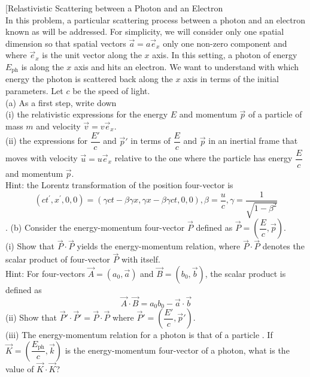 \newpage
\begin{solution}[{\large\color{plainred}Relastivistic Scattering between a Photon and an Electron}\\
	\small
	 In this problem, a particular scattering process between a photon and an electron known as  will be addressed. For simplicity, we will consider only one spatial dimension so that spatial vectors $\vec{a}=a\vec{e}_x$   only one non-zero component and where $\vec{e}_x$ is the unit vector along the $x$ axis. In this setting, a photon of energy $E_\mathrm{ph}$ is  along the $x$ axis and hits an electron. We want to understand with which energy the photon is scattered back along the $x$ axis in terms of the initial parameters. Let $c$ be the speed of light.
	\\(a) As a first step, write down
	\\\hspace*{2em}(i) the relativistic expressions for the energy $E$ and momentum $\vec{p}$ of a particle of mass $m$ and velocity $\vec{v} = v\vec{e}_x$.
	\\\hspace*{2em}(ii) the expressions for $\dfrac{E'}{c}$ and $\vec{p}'$ in terms of $\dfrac{E}{c}$ and $\vec{p}$ in an inertial frame that moves with
	velocity $\vec{u}=u\vec{e}_{x}$ relative to the one where the particle has energy $\dfrac{E}{c}$ and momentum $\vec{p}$.\\
	Hint: the Lorentz transformation of the position four-vector is \[(ct^{\prime},x^{\prime},0,0)=(\gamma ct-\beta\gamma x,\gamma x-\beta \gamma ct, 0, 0), \beta = \dfrac{u}{c}, \gamma = \dfrac{1}{\sqrt {1- \beta ^2}}\]. 
	(b) Consider the energy-momentum four-vector $\vec{P}$ defined as $\vec{P}=(\dfrac{E}{c},\vec{p})$.\\
	\hspace*{2em}(i) Show that $\vec{P}\cdot\vec{P}$ yields the energy-momentum relation, where $\vec{P}\cdot\vec{P}$ denotes the scalar product of four-vector $\vec{P}$ with itself.\\ Hint: For four-vectors $\vec{A}=(a_0,\vec{a})$ and $\vec{B}=(b_0,\vec{b})$, the scalar product is defined as  \[\vec{A}\cdot\vec{B}=a_{0}b_{0}-\vec{a}\cdot\vec{b}\]
	\hspace*{2em}(ii) Show that $\vec{P}'\cdot\vec{P}'=\vec{P}\cdot\vec{P}$ where $\vec{P}'=(\dfrac{E'}{c},\vec{p}')$.\\
	\hspace*{2em}(iii) The energy-momentum relation for a photon is that of a particle . If $\vec{K} = ( \dfrac{E_{\mathrm{ph}}}{c}, \vec{k} )$ is the energy-momentum four-vector of a photon, what is the value of $\vec{K}\cdot\vec{K}$?\\

\end{solution}
